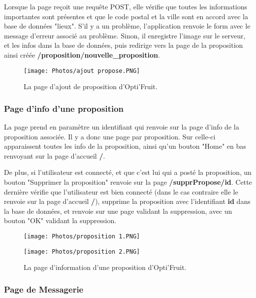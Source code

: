 \documentclass{article}
\begin{document}
Lorsque la page reçoit une requête POST, elle vérifie que toutes les informations importantes sont présentes et que le code postal et la ville sont en accord avec la base de données "lieux". S'il y a un problème, l'application renvoie le form avec le message d'erreur associé au problème. Sinon, il enregistre l'image sur le serveur, et les infos dans la base de données, puis redirige vers la page de la proposition ainsi créée \textbf{/proposition/nouvelle\_proposition}.

\begin{figure}[h!]
    \centering
    \texttt{[image: Photos/ajout propose.PNG]}
    \caption{La page d'ajout de proposition d'Opti'Fruit.}
    \label{fig:my_label}
\end{figure}

\subsubsection{Page d'info d'une proposition}

La page prend en paramètre un identifiant qui renvoie sur la page d'info de la proposition associée. Il y a donc une page par proposition. Sur celle-ci apparaissent toutes les info de la proposition, ainsi qu'un bouton "Home" en bas renvoyant sur la page d'accueil \textbf{/}.

De plus, si l'utilisateur est connecté, et que c'est lui qui a posté la proposition, un bouton "Supprimer la proposition" renvoie sur la page \textbf{/supprPropose/id}. Cette dernière vérifie que l'utilisateur est bien connecté (dans le cas contraire elle le renvoie sur la page d'accueil \textbf{/}), supprime la proposition avec l'identifiant \textbf{id} dans la base de données, et renvoie sur une page validant la suppression, avec un bouton "OK" validant la suppression.

\begin{figure}[h!]
    \centering
    \texttt{[image: Photos/proposition 1.PNG]}
    \label{fig:my_label}
\end{figure}
\begin{figure}[h!]
    \centering
    \texttt{[image: Photos/proposition 2.PNG]}
    \caption{La page d'information d'une proposition d'Opti'Fruit.}
    \label{fig:my_label}
\end{figure}
\vspace{2cm}
\subsubsection{Page de Messagerie}
\end{document}
